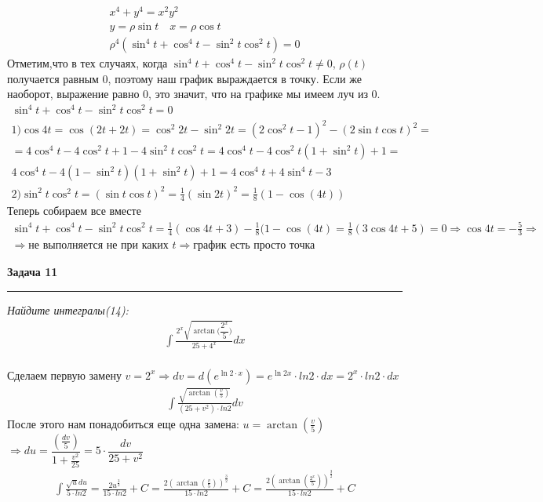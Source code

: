 \documentclass[a4paper,11pt]{article}
\begin{document}
\begin{gather*}
x^4 + y^4 = x^2y^2 \\[2pt]
y = \rho \sin t \quad x = \rho \cos t \\[2pt]
\rho^4(\sin^4 t + \cos^4 t - \sin^2t \cos^2t) = 0
\end{gather*}
Отметим,что в тех случаях, когда $ \sin^4 t + \cos^4 t - \sin^2t \cos^2t \neq 0 $, $ \rho(t)  $ получается равным 0, поэтому наш график выраждается в точку. Если же наоборот, выражение равно 0, это значит, что на графике мы имеем луч из 0.
\begin{gather*}
\sin^4 t + \cos^4 t - \sin^2t \cos^2t = 0 \\[2pt]
1)\cos 4t = \cos (2t + 2t) = \cos^2 2t - \sin^2 2t = (2\cos^2t - 1)^2 - (2\sin t \cos t)^2 =\\[2pt]
= 4\cos^4t - 4\cos^2t + 1 - 4\sin^2 t \cos^2 t =
4\cos^4t - 4\cos^2t(1 + \sin^2 t) + 1 = \\[2pt]
4\cos^4t - 4(1 - \sin^2 t)(1 + \sin^2 t) + 1 = 4\cos^4t + 4\sin^4t - 3\\[2pt]
2)\sin^2t \cos^2t = (\sin t \cos t)^2 = \frac14 (\sin2t)^2 = \frac18(1 - \cos(4t))
\end{gather*}
Теперь собираем все вместе
\begin{gather*}
\sin^4 t + \cos^4 t - \sin^2t \cos^2t = \frac14(\cos4t + 3) - \frac18(1 - \cos(4t) = \frac18 (3\cos4t + 5) = 0 \Rightarrow \cos4t = -\frac53 \Rightarrow\\[2pt] 
\Rightarrow \text{не выполняется не при каких }t \Rightarrow \text{график есть просто точка}
\end{gather*}







\newpage
\textbf{\large Задача 11}
\medskip\hrule\medskip
\textsl{Найдите интегралы(14):}
\begin{align*}
	\int \frac{2^x \sqrt{\arctan \big (\dfrac{2^x}5 \big )}}{25 + 4^x}dx
\end{align*} \\

Сделаем первую замену $ v = 2^x \Rightarrow dv = d(e^{\ln2 \cdot x}) = e^{\ln2x} \cdot ln2 \cdot dx = 2^x \cdot ln2 \cdot dx$
\begin{gather*}
	 \int \frac{\sqrt{\arctan(\frac{v}{5})}}{(25 + v^2) \cdot ln2}dv
\end{gather*}
После этого нам понадобиться еще одна замена: $ u = \arctan(\frac{v}5) $ \\
$ \Rightarrow du = \dfrac{(\frac{dv}{5})}{1 + \frac{v^2}{25}} = 5 \cdot \dfrac{dv}{25 + v^2} $
\begin{gather*}
	\int \frac{\sqrt{u}du}{5 \cdot ln2} = \frac{2u^{\frac{3}{2}}}{15 \cdot ln2} + C = \frac{2(\arctan(\frac{v}{5}))^{\frac{3}{2}}}{15 \cdot ln2} + C = 
	\frac{2(\arctan(\frac{2^x}{5}))^{\frac{3}{2}}}{15 \cdot ln2} + C
\end{gather*}
\\ \\ \\
\end{document}
